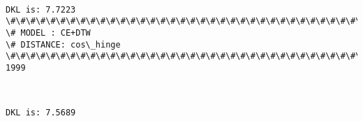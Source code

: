 \documentclass[11pt]{article}
\begin{document}
    \begin{center}
    \end{center}
    { \hspace*{\fill} \\}
    
    \begin{Verbatim}[commandchars=\\\{\}]
DKL is: 7.7223
\#\#\#\#\#\#\#\#\#\#\#\#\#\#\#\#\#\#\#\#\#\#\#\#\#\#\#\#\#\#\#\#\#\#\#\#\#\#\#\#\#\#\#\#\#\#\#\#\#\#\#\#\#\#\#\#\#\#\#\#\#\#\#\#\#\#\#\#\#\#\#\#\#\#\#\#
\# MODEL : CE+DTW
\# DISTANCE: cos\_hinge
\#\#\#\#\#\#\#\#\#\#\#\#\#\#\#\#\#\#\#\#\#\#\#\#\#\#\#\#\#\#\#\#\#\#\#\#\#\#\#\#\#\#\#\#\#\#\#\#\#\#\#\#\#\#\#\#\#\#\#\#\#\#\#\#\#\#\#\#\#\#\#\#\#\#\#\#
1999

    \end{Verbatim}

    \begin{center}
    \end{center}
    { \hspace*{\fill} \\}
    
    \begin{Verbatim}[commandchars=\\\{\}]
DKL is: 7.5689

    \end{Verbatim}


    
    
    
    
\end{document}
